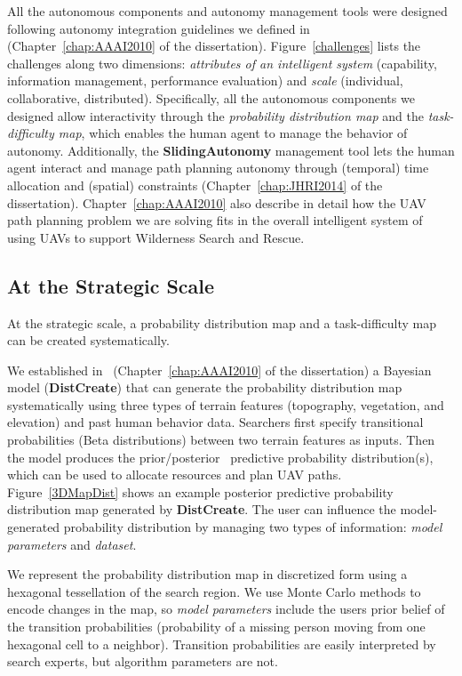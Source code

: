 All the autonomous components and autonomy management tools were designed following autonomy integration guidelines we defined in~\cite{Lin2010Supporting} (Chapter~\ref{chap:AAAI2010} of the dissertation). Figure~\ref{challenges} lists the challenges along two dimensions: \textit{attributes of an intelligent system} (capability, information management, performance evaluation) and \textit{scale} (individual, collaborative, distributed). Specifically, all the autonomous components we designed allow interactivity through the \textit{probability distribution map} and the \textit{task-difficulty map}, which enables the human agent to manage the behavior of autonomy. Additionally, the \textbf{SlidingAutonomy} management tool lets the human agent interact and manage path planning autonomy through (temporal) time allocation and (spatial) constraints (Chapter~\ref{chap:JHRI2014} of the dissertation). Chapter~\ref{chap:AAAI2010} also describe in detail how the UAV path planning problem we are solving fits in the overall intelligent system of using UAVs to support Wilderness Search and Rescue. 

\subsection{At the Strategic Scale}

At the strategic scale, a probability distribution map and a task-difficulty map can be created systematically.

We established in~\cite{Lin2010Bayesian} (Chapter~\ref{chap:AAAI2010} of the dissertation) a Bayesian model (\textbf{DistCreate}) that can generate the probability distribution map systematically using three types of terrain features (topography, vegetation, and elevation) and past human behavior data. Searchers first specify transitional probabilities (Beta distributions) between two terrain features as inputs. Then the model produces the prior/posterior~\cite{Russell2009Artificial} predictive probability distribution(s), which can be used to allocate resources and plan UAV paths. Figure~\ref{3DMapDist} shows an example posterior predictive probability distribution map generated by \textbf{DistCreate}. The user can influence the model-generated probability distribution by managing two types of information: \textit{model parameters} and \textit{dataset}. 

We represent the probability distribution map in discretized form using a hexagonal tessellation of the search region. We use Monte Carlo methods to encode changes in the map, so \textit{model parameters} include the users prior belief of the transition probabilities (probability of a missing person moving from one hexagonal cell to a neighbor). Transition probabilities are easily interpreted by search experts, but algorithm parameters are not. 

